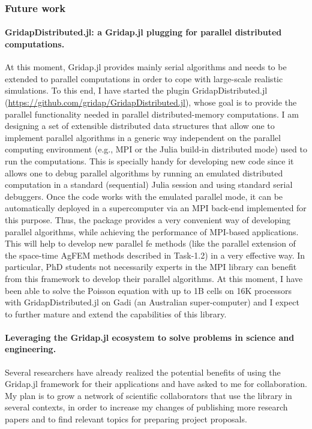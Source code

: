 \documentclass{article}
\begin{document}
\subsubsection*{Future work}
 
 
\paragraph*{GridapDistributed.jl: a  Gridap.jl plugging for parallel distributed computations.} 

At this moment, Gridap.jl provides mainly serial algorithms and needs to be extended to parallel computations in order to cope with large-scale realistic simulations. To this end, I have started the plugin GridapDistributed.jl (\url{https://github.com/gridap/GridapDistributed.jl}), whose goal is to provide the parallel functionality needed in parallel distributed-memory computations. I am designing a set of extensible distributed data structures that allow one to implement parallel algorithms in a generic way independent on the parallel computing environment (e.g., MPI or the Julia build-in distributed mode) used to run the computations. This is specially handy for developing new code since it allows one to debug parallel algorithms by running an emulated distributed computation in a standard (sequential) Julia session and using standard serial debuggers.  Once the code works with the emulated parallel mode, it can be automatically deployed in a supercomputer via an MPI back-end implemented for this purpose. Thus, the package provides a very convenient way of developing parallel algorithms, while achieving the performance of MPI-based applications. This will help to develop new parallel \ac{fe} methods (like the parallel extension of the space-time AgFEM methods described in Task-1.2) in a very effective way. In particular, PhD students not necessarily experts in the MPI library can benefit from this framework to develop their parallel algorithms. At this moment, I have been able to solve the Poisson equation with up to 1B cells on 16K processors with GridapDistributed.jl on Gadi (an Australian super-computer) and I expect to further mature and extend the capabilities of this library.  
 
\paragraph*{Leveraging the Gridap.jl ecosystem to solve problems in science and engineering.}

Several researchers have already realized the potential benefits of using the Gridap.jl framework for their applications and have asked to me for collaboration. My plan is to grow a network of scientific collaborators that use the library in several contexts, in order to increase my changes of publishing more research papers and to find relevant topics for preparing project proposals. 
 
 



\end{document}
